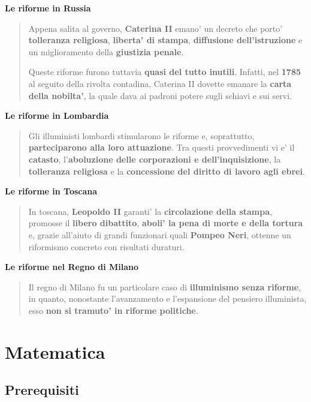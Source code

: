 \documentclass{article}
\begin{document}
{{    \textbf{Le riforme in Russia}
    \begin{quote}
      Appena salita al governo, \textbf{Caterina II} emano' un decreto che porto' \textbf{tolleranza religiosa}, \textbf{liberta' di stampa}, \textbf{diffusione dell'istruzione} e un miglioramento della \textbf{giustizia penale}.

      Queste riforme furono tuttavia \textbf{quasi del tutto inutili}. Infatti, nel \textbf{1785} al seguito della rivolta contadina, Caterina II dovette emanare la \textbf{carta della nobilta'}, la quale dava ai padroni potere sugli schiavi e sui servi.
    \end{quote}

    \textbf{Le riforme in Lombardia}
    \begin{quote}
      Gli illuministi lombardi stimularono le riforme e, soprattutto, \textbf{parteciparono alla loro attuazione}. Tra questi provvedimenti vi e' il \textbf{catasto}, l'\textbf{aboluzione delle corporazioni e dell'inquisizione}, la \textbf{tolleranza religiosa} e la \textbf{concessione del diritto di lavoro agli ebrei}.
    \end{quote}

    \textbf{Le riforme in Toscana}
    \begin{quote}
      In toscana, \textbf{Leopoldo II} garanti' la \textbf{circolazione della stampa}, promosse il \textbf{libero dibattito}, \textbf{aboli' la pena di morte e della tortura} e, grazie all'aiuto di grandi funzionari quali \textbf{Pompeo Neri}, ottenne un riformismo concreto con risultati duraturi.
    \end{quote}

    \textbf{Le riforme nel Regno di Milano}
    \begin{quote}
      Il regno di Milano fu un particolare caso di \textbf{illuminismo senza riforme}, in quanto, nonostante l'avanzamento e l'espansione del pensiero illuminista, esso \textbf{non si tramuto' in riforme politiche}.
    \end{quote}
 }

  \pagebreak
  \section{Matematica}
  {
    \subsection{Prerequisiti}
}}
\end{document}
